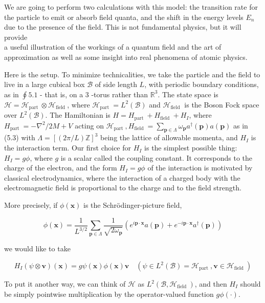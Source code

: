 \documentclass[10pt, letterpaper]{article}
\begin{document}
We are going to perform two calculations with this model: the transition rate for the particle to emit or absorb field quanta, and the shift in the energy levels $E_{n}$ due to the presence of the field. This is not fundamental physics, but it will provide\\
a useful illustration of the workings of a quantum field and the art of approximation as well as some insight into real phenomena of atomic physics.

Here is the setup. To minimize technicalities, we take the particle and the field to live in a large cubical box $\mathcal{B}$ of side length $L$, with periodic boundary conditions, as in $\oint 5.1$ - that is, on a 3 -torus rather than $\mathbb{R}^{3}$. The state space is $\mathcal{H}=\mathcal{H}_{\text {part }} \otimes \mathcal{H}_{\text {field }}$, where $\mathcal{H}_{\text {part }}=L^{2}(\mathcal{B})$ and $\mathcal{H}_{\text {field }}$ is the Boson Fock space over $L^{2}(\mathcal{B})$. The Hamiltonian is $H=H_{\text {part }}+H_{\text {field }}+H_{I}$, where $H_{\text {part }}=-\nabla^{2} / 2 M+V$ acting on $\mathcal{H}_{\text {part }}, H_{\text {field }}=\sum_{\mathbf{p} \in \Lambda} \omega_{\mathbf{p}} a^{\dagger}(\mathbf{p}) a(\mathbf{p})$ as in (5.3) with $\Lambda=[(2 \pi / L) \mathbb{Z}]^{3}$ being the lattice of allowable momenta, and $H_{I}$ is the interaction term. Our first choice for $H_{I}$ is the simplest possible thing: $H_{I}=g \phi$, where $g$ is a scalar called the coupling constant. It corresponds to the charge of the electron, and the form $H_{I}=g \phi$ of the interaction is motivated by classical electrodynamics, where the interaction of a charged body with the electromagnetic field is proportional to the charge and to the field strength.

More precisely, if $\phi(\mathbf{x})$ is the Schrödinger-picture field,

$$
\phi(\mathbf{x})=\frac{1}{L^{3 / 2}} \sum_{\mathbf{p} \in \Lambda} \frac{1}{\sqrt{2 \omega_{\mathbf{p}}}}\left(e^{i \mathbf{p} \cdot \mathbf{x}} a(\mathbf{p})+e^{-i \mathbf{p} \cdot \mathbf{x}} a^{\dagger}(\mathbf{p})\right)
$$

we would like to take

$$
H_{I}(\psi \otimes \mathbf{v})(\mathbf{x})=g \psi(\mathbf{x}) \phi(\mathbf{x}) \mathbf{v} \quad\left(\psi \in L^{2}(\mathcal{B})=\mathcal{H}_{\text {part }}, \mathbf{v} \in \mathcal{H}_{\text {field }}\right)
$$

To put it another way, we can think of $\mathcal{H}$ as $L^{2}\left(\mathcal{B}, \mathcal{H}_{\text {field }}\right)$, and then $H_{I}$ should be simply pointwise multiplication by the operator-valued function $g \phi(\cdot)$.
\end{document}
